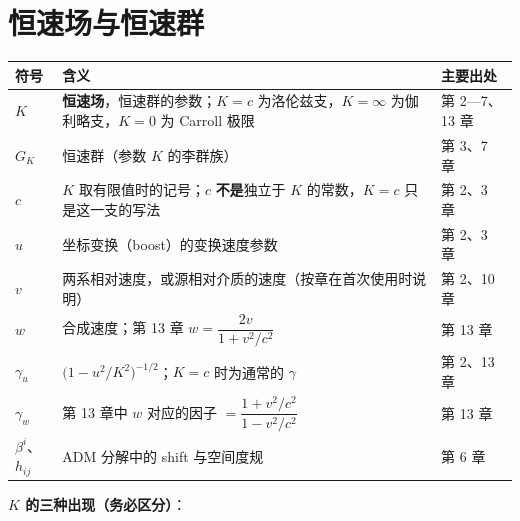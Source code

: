 \documentclass[
  chinese,
  a4paper,
  UTF8,
  12pt,
  oneside,
  openany]{ctexbook}
\newcounter{none} %
\theoremstyle{plain}
\theoremstyle{plain}
\theoremstyle{plain}
\theoremstyle{definition}
\theoremstyle{plain}
\theoremstyle{plain}
\theoremstyle{remark}
\begin{document}
\section*{恒速场与恒速群}\label{sec-notation-K}


{\def\LTcaptype{none} %
\begin{longtable}[]{@{}
  >{\raggedright\arraybackslash}p{}
  >{\raggedright\arraybackslash}p{}
  >{\raggedright\arraybackslash}p{}@{}}
\toprule\noalign{}
\begin{minipage}[b]{\linewidth}\raggedright
符号
\end{minipage} & \begin{minipage}[b]{\linewidth}\raggedright
含义
\end{minipage} & \begin{minipage}[b]{\linewidth}\raggedright
主要出处
\end{minipage} \\
\midrule\noalign{}
\endhead
\bottomrule\noalign{}
\endlastfoot
\(K\) & \textbf{恒速场}，恒速群的参数；\(K=c\) 为洛伦兹支，\(K=\infty\)
为伽利略支，\(K=0\) 为 Carroll 极限 & 第 2---7、13 章 \\
\(G_{K}\) & 恒速群（参数 \(K\) 的李群族） & 第 3、7 章 \\
\(c\) & \(K\) 取有限值时的记号；\(c\) \textbf{不是}独立于 \(K\)
的常数，\(K=c\) 只是这一支的写法 & 第 2、3 章 \\
\(u\) & 坐标变换（boost）的变换速度参数 & 第 2、3 章 \\
\(v\) & 两系相对速度，或源相对介质的速度（按章在首次使用时说明） & 第
2、10 章 \\
\(w\) & 合成速度；第 13 章 \(w=\dfrac{2v}{1+v^{2}/c^{2}}\) & 第 13 章 \\
\(\gamma_{u}\) & \(\bigl(1-u^{2}/K^{2}\bigr)^{-1/2}\)；\(K=c\)
时为通常的 \(\gamma\) & 第 2、13 章 \\
\(\gamma_{w}\) & 第 13 章中 \(w\) 对应的因子
\(=\dfrac{1+v^{2}/c^{2}}{1-v^{2}/c^{2}}\) & 第 13 章 \\
\(\beta^{i}\)、\(h_{ij}\) & ADM 分解中的 shift 与空间度规 & 第 6 章 \\
\end{longtable}
}

\textbf{\(K\) 的三种出现（务必区分）}：
\end{document}
